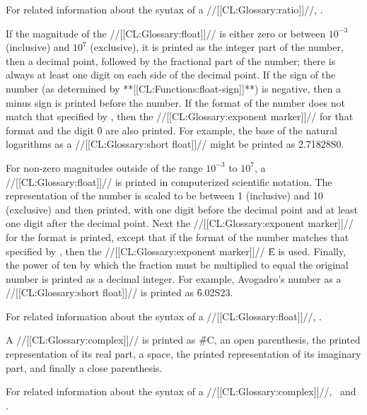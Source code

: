 For related information about the syntax of a //[[CL:Glossary:ratio]]//, \seesection\SyntaxOfRatios.

\endsubsubsubsection%

If the magnitude of the //[[CL:Glossary:float]]// is either zero or between $10^{-3}$ (inclusive) and $10^7$ (exclusive), it is printed as the integer part of the number, then a decimal point, followed by the fractional part of the number; there is always at least one digit on each side of the decimal point.     If the sign of the number (as determined by **[[CL:Functions:float-sign]]**) is negative, then a minus sign is printed before the number. If the format of the number does not match that specified by , then the //[[CL:Glossary:exponent marker]]// for that format and the digit \f{0} are also printed. For example, the base of the natural logarithms as a //[[CL:Glossary:short float]]// might be printed as \f{2.71828S0}.

For non-zero magnitudes outside of the range $10^{-3}$ to $10^7$, a //[[CL:Glossary:float]]// is printed in computerized scientific notation. The representation of the number is scaled to be between 1 (inclusive) and 10 (exclusive) and then printed, with one digit before the decimal point and at least one digit after the decimal point. Next the //[[CL:Glossary:exponent marker]]// for the format is printed, except that if the format of the number matches that specified by  , then the //[[CL:Glossary:exponent marker]]// \f{E} is used. Finally, the power of ten by which the fraction must be multiplied to equal the original number is printed as a decimal integer. For example, Avogadro's number as a //[[CL:Glossary:short float]]//  is printed as \f{6.02S23}.

For related information about the syntax of a //[[CL:Glossary:float]]//, \seesection\SyntaxOfFloats.

\endsubsubsubsection%

A //[[CL:Glossary:complex]]// is printed as \f{\#C}, an open parenthesis, the printed representation of its real part, a space, the printed representation of its imaginary part, and finally a close parenthesis.

For related information about the syntax of a //[[CL:Glossary:complex]]//, \seesection\SyntaxOfComplexes\ and \secref\SharpsignC.

